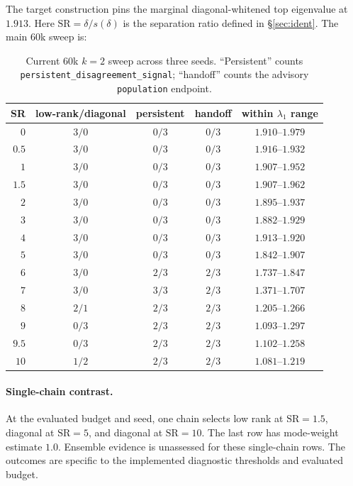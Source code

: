 \documentclass[11pt]{article}
\theoremstyle{plain}
\theoremstyle{definition}
\theoremstyle{remark}
\begin{document}
The target construction pins the marginal diagonal-whitened top eigenvalue at
$1.913$. Here $\mathrm{SR}=\delta/s(\delta)$ is the separation ratio defined in
\S\ref{sec:ident}. The main $60$k sweep is:
\begin{table}[htbp]\centering
\caption{Current $60$k $k=2$ sweep across three seeds. ``Persistent'' counts
\nolinkurl{persistent_disagreement_signal}; ``handoff'' counts the advisory
\texttt{population} endpoint.}
\label{tab:gmm-regimes}
\small
\setlength{\tabcolsep}{5pt}
\begin{tabular}{@{}rcccc@{}}
\toprule
SR & low-rank/diagonal & persistent & handoff & within $\lambda_1$ range \\
\midrule
$0$   & $3/0$ & $0/3$ & $0/3$ & $1.910$--$1.979$ \\
$0.5$ & $3/0$ & $0/3$ & $0/3$ & $1.916$--$1.932$ \\
$1$   & $3/0$ & $0/3$ & $0/3$ & $1.907$--$1.952$ \\
$1.5$ & $3/0$ & $0/3$ & $0/3$ & $1.907$--$1.962$ \\
$2$   & $3/0$ & $0/3$ & $0/3$ & $1.895$--$1.937$ \\
$3$   & $3/0$ & $0/3$ & $0/3$ & $1.882$--$1.929$ \\
$4$   & $3/0$ & $0/3$ & $0/3$ & $1.913$--$1.920$ \\
$5$   & $3/0$ & $0/3$ & $0/3$ & $1.842$--$1.907$ \\
$6$   & $3/0$ & $2/3$ & $2/3$ & $1.737$--$1.847$ \\
$7$   & $3/0$ & $3/3$ & $2/3$ & $1.371$--$1.707$ \\
$8$   & $2/1$ & $2/3$ & $2/3$ & $1.205$--$1.266$ \\
$9$   & $0/3$ & $2/3$ & $2/3$ & $1.093$--$1.297$ \\
$9.5$ & $0/3$ & $2/3$ & $2/3$ & $1.102$--$1.258$ \\
$10$  & $1/2$ & $2/3$ & $2/3$ & $1.081$--$1.219$ \\
\bottomrule
\end{tabular}
\end{table}

\paragraph{Single-chain contrast.}
At the evaluated budget and seed, one chain selects low rank at
$\mathrm{SR}=1.5$, diagonal at $\mathrm{SR}=5$, and diagonal at
$\mathrm{SR}=10$. The last row has mode-weight estimate $1.0$. Ensemble
evidence is unassessed for these single-chain rows. The outcomes are specific
to the implemented diagnostic thresholds and evaluated budget.
\end{document}
